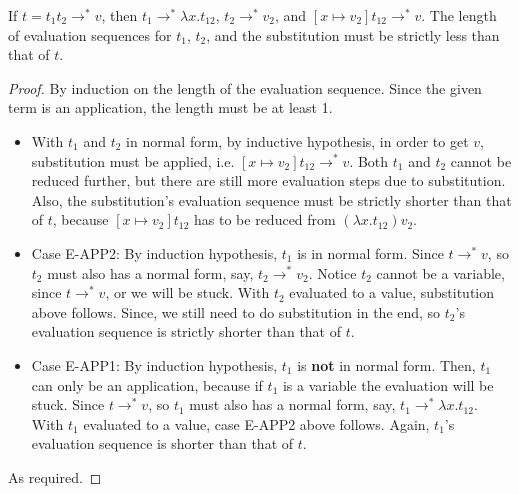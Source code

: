 \documentclass[12pt]{article}
\begin{document}
\begin{lemma}
\label{lemma:recover}
If $t = t_1t_2 \rightarrow^* v$, then $t_1 \rightarrow^* \lambda x . t_{12}$, $t_2 \rightarrow^* v_2$, and $[x \mapsto v_2] t_{12} \rightarrow^* v$.
The length of evaluation sequences for $t_1$, $t_2$, and the substitution must be strictly less than that of $t$.
\end{lemma}
\begin{proof}
By induction on the length of the evaluation sequence.
Since the given term is an application, the length must be at least 1.
\begin{itemize}
\item
With $t_1$ and $t_2$ in normal form, by inductive hypothesis, in order to get $v$, substitution must be applied, i.e. $[x \mapsto v_2] t_{12} \rightarrow^* v$.
Both $t_1$ and $t_2$ cannot be reduced further, but there are still more evaluation steps due to substitution.
Also, the substitution's evaluation sequence must be strictly shorter than that of $t$, because $[x \mapsto v_2] t_{12}$ has to be reduced from $(\lambda x . t_{12}) v_2$.
\item
Case E-APP2:
By induction hypothesis, $t_1$ is in normal form.
Since $t \rightarrow^* v$, so $t_2$ must also has a normal form, say, $t_2 \rightarrow^* v_2$.
Notice $t_2$ cannot be a variable, since $t \rightarrow^* v$, or we will be stuck.
With $t_2$ evaluated to a value, substitution above follows.
Since, we still need to do substitution in the end, so $t_2$'s evaluation sequence is strictly shorter than that of $t$.
\item
Case E-APP1:
By induction hypothesis, $t_1$ is {\bf not} in normal form.
Then, $t_1$ can only be an application, because if $t_1$ is a variable the evaluation will be stuck.
Since $t \rightarrow^* v$, so $t_1$ must also has a normal form, say, $t_1 \rightarrow^* \lambda x.t_{12}$.
With $t_1$ evaluated to a value, case E-APP2 above follows.
Again, $t_1$'s evaluation sequence is shorter than that of $t$.
\end{itemize}
As required.
\end{proof}
\end{document}
